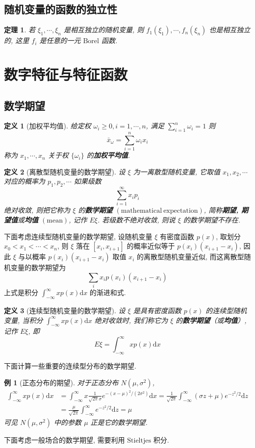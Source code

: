 \documentclass[12pt,a4paper]{article}
\newtheorem{thm}{定理}[subsection]  %
\newtheorem{definition}{定义}[subsection] %
\newtheorem{example}{例}[subsection] %
\begin{document}
\subsection{随机变量的函数的独立性}
\begin{thm}
    若 $\xi_1, \cdots, \xi_n$ 是相互独立的随机变量, 则 $f_1(\xi_1), \cdots, f_n(\xi_n)$ 也是相互独立的, 这里 $f_i$ 是任意的一元 $\mathrm{Borel}$ 函数.
\end{thm}
\newpage
\section{数字特征与特征函数}
\subsection{数学期望}
\begin{definition}[加权平均值]
    给定权 $\omega_i \geq 0, i=1, \cdots, n$, 满足 $\sum\limits_{i=1}^n \omega_i= 1$ 则
    \[\bar{x}_\omega = \sum\limits_{i=1}^n \omega_i x_i\] 称为 $x_1, \cdots, x_n$ 关于权 $\{\omega_i\}$ 的\textbf{加权平均值}.
\end{definition}
\begin{definition}[离散型随机变量的数学期望]
    设 $\xi$ 为一离散型随机变量, 它取值 $x_1, x_2, \cdots$ 对应的概率为 $p_1, p_2, \cdots$ 如果级数
    \[\sum\limits_{i=1}^{\infty} x_i p_i \] 绝对收敛, 则把它称为 $\xi$ 的\textbf{数学期望} $(\mathrm{mathematical\ expectation})$, 
    简称\textbf{期望, 期望值}或\textbf{均值} $(\mathrm{mean})$, 记作 $E\xi$. 若级数不绝对收敛, 则说 $\xi$ 的数学期望不存在.
\end{definition}
下面考虑连续型随机变量的数学期望, 设随机变量 $\xi$ 有密度函数 $p(x)$, 取划分 $x_0<x_1<\cdots<x_n$, 则 $\xi$ 落在
$[x_i, x_{i+1}]$ 的概率近似等于 $p(x_i)(x_{i+1}-x_i)$, 因此 $\xi$ 与以概率 $p(x_i)(x_{i+1}-x_i)$ 取值 $x_i$ 的离散型随机变量近似, 而这离散型随机变量的数学期望为
\[\sum\limits_{i} x_ip(x_i)(x_{i+1}-x_i)\] 上式是积分 $\int_{-\infty}^{\infty} xp(x) \mathrm{d}x$ 的渐进和式.
\begin{definition}[连续型随机变量的数学期望]
    设 $\xi$ 是具有密度函数 $p(x)$ 的连续型随机变量, 当积分 $\int_{-\infty}^{\infty} xp(x) \mathrm{d}x$ 绝对收敛时, 我们称它为 $\xi$ 的\textbf{数学期望}（或\textbf{均值}）, 记作 $E\xi$, 即
    \[ E\xi = \int_{-\infty}^{\infty} xp(x) \mathrm{d}x \]
\end{definition}
下面计算一些重要的连续型分布的数学期望.
\begin{example}[正态分布的期望]
    对于正态分布 $N(\mu, \sigma^2)$,
    \[\begin{aligned}
        \int_{-\infty}^{\infty} xp(x) \mathrm{d}x & = \int_{-\infty}^{\infty} x\frac{1}{\sqrt{2\pi}\sigma} e^{-(x-\mu)^2/(2\sigma^2)} \mathrm{d}x 
        = \frac{1}{\sqrt{2\pi}} \int_{-\infty}^{\infty} (\sigma z + \mu) e^{-z^2 / 2} \mathrm{d}z \\ 
        & = \frac{\mu}{\sqrt{2\pi}} \int_{-\infty}^{\infty} e^{-z^2/2} \mathrm{d}z = \mu
    \end{aligned}\]
    可见 $N(\mu, \sigma^2)$ 中的参数 $\mu$ 正是它的数学期望.
\end{example}
下面考虑一般场合的数学期望, 需要利用 $\mathrm{Stieltjes}$ 积分.
\end{document}
